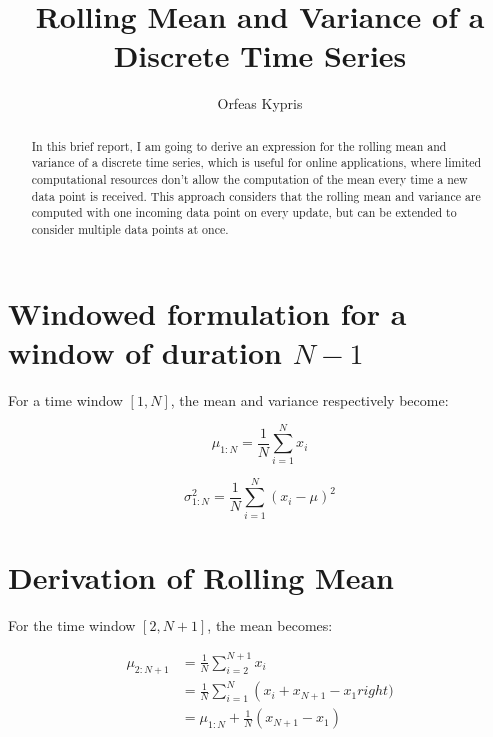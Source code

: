 \documentclass[12pt]{article}
\begin{document}
 
 
 
\title{Rolling Mean and Variance of a Discrete Time Series}%
\author{Orfeas Kypris} %
 
\maketitle
 
 
\begin{abstract}
    In this brief report, I am going to derive an expression for the rolling mean and variance of a discrete time series, which is useful for online applications, where limited computational resources don't allow the computation of the mean every time a new data point is received. This approach considers that the rolling mean and variance are computed with one incoming data point on every update, but can be extended to consider multiple data points at once.
\end{abstract}




\section{Windowed formulation for a window of duration $N-1$}

For a time window $[1,N]$, the mean and variance respectively become:


\begin{equation}
 \mu_{1:N} = \frac{1}{N} \sum^N_{i=1} x_i
 \label{mean}
\end{equation}

\begin{equation}
 \sigma^2_{1:N} = \frac{1}{N} \sum^N_{i=1} (x_i - \mu)^2
\label{std}
 \end{equation}

\section{Derivation of  Rolling Mean}

For the time window $[2,N+1]$, the mean becomes:

\begin{align}
 \mu_{2:N+1} &= \frac{1}{N} \sum^{N+1}_{i=2} x_i \\
	     &= \frac{1}{N} \sum^{N}_{i=1} \left( x_i + x_{N+1} - x_1 right) \\
	     &= \mu_{1:N} + \frac{1}{N} \left( x_{N+1} - x_1 \right)
 \label{mean}
\end{align}
\end{document}
